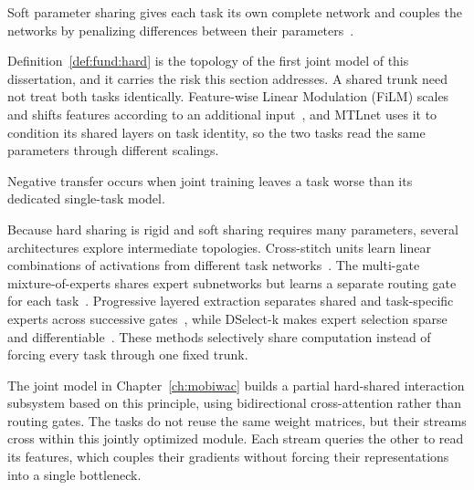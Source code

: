 \begin{definition}\label{def:fund:soft}
    Soft parameter sharing gives each task its own complete network and couples the
    networks by penalizing differences between their
    parameters~\cite{ruder2017mtloverview}.
\end{definition}

Definition~\ref{def:fund:hard} is the topology of the first joint model of this
dissertation, and it carries the risk this section addresses. A shared trunk need not
treat both tasks identically. Feature-wise Linear Modulation (FiLM) scales and shifts
features according to an additional input~\cite{perez2018film}, and MTLnet uses it to
condition its shared layers on task identity, so the two tasks read the same
parameters through different scalings.

\begin{definition}\label{def:fund:negtransfer}
    Negative transfer occurs when joint training leaves a task worse than its dedicated
    single-task model.
\end{definition}

Because hard sharing is rigid and soft sharing requires many parameters, several
architectures explore intermediate topologies. Cross-stitch units learn linear
combinations of activations from different task networks~\cite{misra2016cross}.
The multi-gate mixture-of-experts shares expert subnetworks but learns a
separate routing gate for each task~\cite{ma2018mmoe}. Progressive layered
extraction separates shared and task-specific experts across successive
gates~\cite{tang2020ple}, while DSelect-k makes expert selection sparse and
differentiable~\cite{hazimeh2021dselectk}. These methods selectively share
computation instead of forcing every task through one fixed trunk.

The joint model in Chapter~\ref{ch:mobiwac} builds a partial hard-shared interaction
subsystem based on this principle, using bidirectional cross-attention rather than
routing gates. The tasks do not reuse the same weight matrices, but their streams
cross within this jointly optimized module. Each stream queries the other to read its
features, which couples their gradients without forcing their representations into a
single bottleneck.

